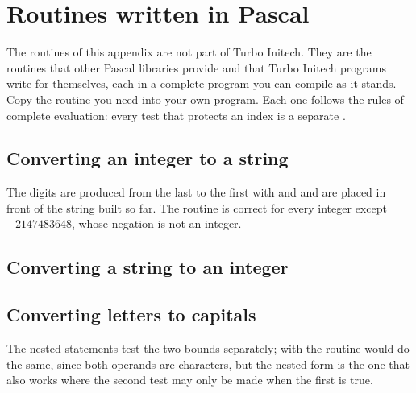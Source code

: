 \chapter{Routines written in Pascal}

The routines of this appendix are not part of Turbo Initech.  They are
the routines that other Pascal libraries provide and that Turbo Initech
programs write for themselves, each in a complete program you can compile
as it stands.  Copy the routine you need into your own program.  Each one
follows the rules of complete evaluation: every test that protects an
index is a separate .

\section{Converting an integer to a string}

The digits are produced from the last to the first with  and
 and are placed in front of the string built so far.  The routine
is correct for every integer except $-2147483648$, whose negation is not an
integer.

\section{Converting a string to an integer}

\section{Converting letters to capitals}

The nested  statements test the two bounds separately; with 
the routine would do the same, since both operands are characters, but
the nested form is the one that also works where the second test may only
be made when the first is true.

